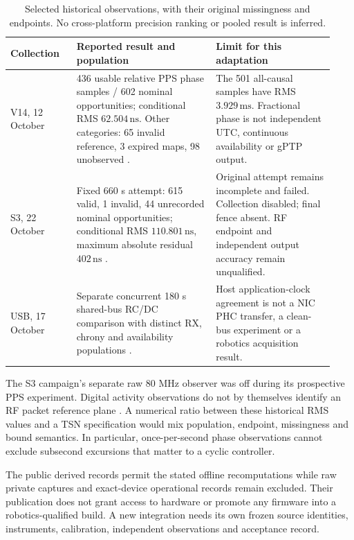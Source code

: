 \documentclass[11pt,letterpaper]{article}
\newcommand{\ns}{\,\mathrm{ns}}\newcommand{\us}{\,\mu\mathrm{s}}\newcommand{\ms}{\,\mathrm{ms}}\newcommand{\ppm}{\,\mathrm{ppm}}
\begin{document}
\begin{table}[htbp]\centering\small
\caption{Selected historical observations, with their original missingness and endpoints. No cross-platform precision ranking or pooled result is inferred.}\label{tab:evidence}
\begin{tabular}{@{}L{0.19\linewidth}L{0.40\linewidth}L{0.34\linewidth}@{}}\toprule
Collection & Reported result and population & Limit for this adaptation\\\midrule
V14, 12 October & 436 usable relative PPS phase samples / 602 nominal opportunities; conditional RMS $62.504\ns$. Other categories: 65 invalid reference, 3 expired maps, 98 unobserved \cite{v14}. & The 501 all-causal samples have RMS $3.929\ms$. Fractional phase is not independent UTC, continuous availability or gPTP output.\\\addlinespace
S3, 22 October & Fixed 660 s attempt: 615 valid, 1 invalid, 44 unrecorded nominal opportunities; conditional RMS $110.801\ns$, maximum absolute residual $402\ns$ \cite{s3}. & Original attempt remains incomplete and failed. Collection disabled; final fence absent. RF endpoint and independent output accuracy remain unqualified.\\\addlinespace
USB, 17 October & Separate concurrent 180 s shared-bus RC/DC comparison with distinct RX, chrony and availability populations \cite{usb}. & Host application-clock agreement is not a NIC PHC transfer, a clean-bus experiment or a robotics acquisition result.\\\bottomrule
\end{tabular}
\end{table}

The S3 campaign's separate raw 80 MHz observer was off during its prospective PPS experiment. Digital activity observations do not by themselves identify an RF packet reference plane \cite{s3}. A numerical ratio between these historical RMS values and a TSN specification would mix population, endpoint, missingness and bound semantics. In particular, once-per-second phase observations cannot exclude subsecond excursions that matter to a cyclic controller.

The public derived records permit the stated offline recomputations while raw private captures and exact-device operational records remain excluded. Their publication does not grant access to hardware or promote any firmware into a robotics-qualified build. A new integration needs its own frozen source identities, instruments, calibration, independent observations and acceptance record.
\end{document}
